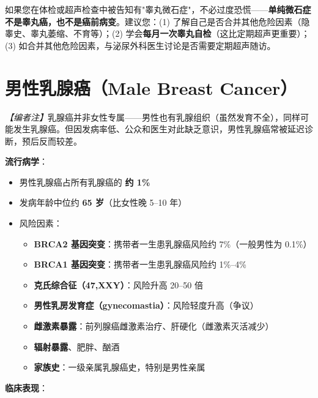 \begin{enumerate}
\begin{tcolorbox}[colback=pink!5!white,colframe=red!50!black,title=贴心小叮咛]
如果您在体检或超声检查中被告知有"睾丸微石症"，不必过度恐慌——\textbf{单纯微石症不是睾丸癌，也不是癌前病变}。建议您：(1) 了解自己是否合并其他危险因素（隐睾史、睾丸萎缩、不育等）；(2) 学会\textbf{每月一次睾丸自检}（这比定期超声更重要）；(3) 如合并其他危险因素，与泌尿外科医生讨论是否需要定期超声随访。
\end{tcolorbox}

\section{男性乳腺癌（Male Breast Cancer）}
\label{sec:male_breast_cancer}

\noindent\textit{【编者注】}乳腺癌并非女性专属——男性也有乳腺组织（虽然发育不全），同样可能发生乳腺癌。但因发病率低、公众和医生对此缺乏意识，男性乳腺癌常被延迟诊断，预后反而较差。

\vspace{0.5em}
\noindent\textbf{流行病学}：

\begin{itemize}[leftmargin=2cm]
	\item 男性乳腺癌占所有乳腺癌的 \textbf{约 1\%}
	\item 发病年龄中位约 \textbf{65 岁}（比女性晚 5--10 年）
	\item 风险因素：
	\begin{itemize}
		\item \textbf{BRCA2 基因突变}：携带者一生患乳腺癌风险约 7\%（一般男性为 0.1\%）
		\item \textbf{BRCA1 基因突变}：携带者一生患乳腺癌风险约 1\%--4\%
		\item \textbf{克氏综合征（47,XXY）}：风险升高 20--50 倍
		\item \textbf{男性乳房发育症（gynecomastia）}：风险轻度升高（争议）
		\item \textbf{雌激素暴露}：前列腺癌雌激素治疗、肝硬化（雌激素灭活减少）
		\item \textbf{辐射暴露}、肥胖、酗酒
		\item \textbf{家族史}：一级亲属乳腺癌史，特别是男性亲属
	\end{itemize}
\end{itemize}

\vspace{0.5em}
\noindent\textbf{临床表现}：


\end{enumerate}
